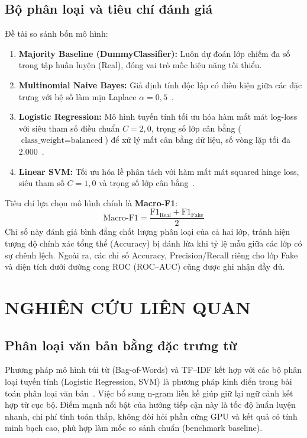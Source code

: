 \documentclass[12pt,a4paper]{report}
\begin{document}
\section{Bộ phân loại và tiêu chí đánh giá}
Đề tài so sánh bốn mô hình:
\begin{enumerate}[leftmargin=24pt]
  \item \textbf{Majority Baseline (DummyClassifier):} Luôn dự đoán lớp chiếm đa số trong tập huấn luyện (Real), đóng vai trò mốc hiệu năng tối thiểu.
  \item \textbf{Multinomial Naive Bayes:} Giả định tính độc lập có điều kiện giữa các đặc trưng với hệ số làm mịn Laplace $\alpha = 0,5$~\cite{scikit_nb}.
  \item \textbf{Logistic Regression:} Mô hình tuyến tính tối ưu hóa hàm mất mát log-loss với siêu tham số điều chuẩn $C = 2,0$, trọng số lớp cân bằng ($\text{class\_weight} = \text{balanced}$) để xử lý mất cân bằng dữ liệu, số vòng lặp tối đa 2.000~\cite{scikit_lr}.
  \item \textbf{Linear SVM:} Tối ưu hóa lề phân tách với hàm mất mát squared hinge loss, siêu tham số $C = 1,0$ và trọng số lớp cân bằng~\cite{scikit_svm}.
\end{enumerate}

Tiêu chí lựa chọn mô hình chính là \textbf{Macro-F1}:
\begin{equation}
  \text{Macro-F1} = \frac{\text{F1}_{\text{Real}} + \text{F1}_{\text{Fake}}}{2}
\end{equation}
Chỉ số này đánh giá bình đẳng chất lượng phân loại của cả hai lớp, tránh hiện tượng độ chính xác tổng thể (Accuracy) bị đánh lừa khi tỷ lệ mẫu giữa các lớp có sự chênh lệch. Ngoài ra, các chỉ số Accuracy, Precision/Recall riêng cho lớp Fake và diện tích dưới đường cong ROC (ROC--AUC) cũng được ghi nhận đầy đủ.

\chapter{NGHIÊN CỨU LIÊN QUAN}

\section{Phân loại văn bản bằng đặc trưng từ}
Phương pháp mô hình túi từ (Bag-of-Words) và TF--IDF kết hợp với các bộ phân loại tuyến tính (Logistic Regression, SVM) là phương pháp kinh điển trong bài toán phân loại văn bản~\cite{scikit_tfidf, scikit_lr, scikit_svm}. Việc bổ sung n-gram liền kề giúp giữ lại ngữ cảnh kết hợp từ cục bộ. Điểm mạnh nổi bật của hướng tiếp cận này là tốc độ huấn luyện nhanh, chi phí tính toán thấp, không đòi hỏi phần cứng GPU và kết quả có tính minh bạch cao, phù hợp làm mốc so sánh chuẩn (benchmark baseline).
\end{document}
